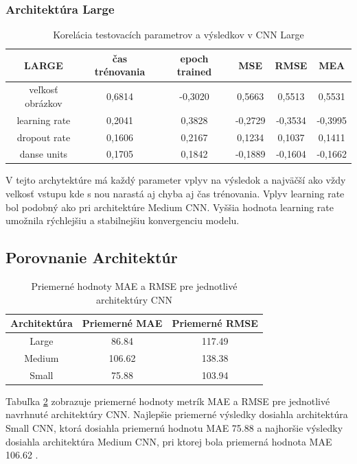 \subsubsection{Architektúra Large}
\begin{table}[h]
\caption{Korelácia testovacích parametrov a výsledkov v CNN Large}
\label{tab:large_corr}
\begin{tabular}{ | c |  c  c c c  c |}
\hline
	LARGE		& čas trénovania &  epoch trained & MSE &  RMSE  & MEA  \\
\hline
veľkosť obrázkov	& 0,6814 & -0,3020 & 0,5663 & 0,5513 & 0,5531\\
learning rate 		& 0,2041& 0,3828 & -0,2729 & -0,3534 & -0,3995 \\
dropout rate 		& 0,1606 & 0,2167 & 0,1234 & 0,1037  & 0,1411 \\
danse units 			& 0,1705& 0,1842 & -0,1889 & -0,1604 & -0,1662 \\
\hline
\end{tabular}
\end{table}
V tejto archytektúre má každý parameter vplyv na výsledok a najväčší ako vždy velkosť vstupu kde s nou narastá aj chyba aj čas trénovania.  Vplyv learning rate bol podobný ako pri architektúre Medium CNN. Vyššia hodnota learning rate umožnila rýchlejšiu a stabilnejšiu konvergenciu modelu.


\subsection{Porovnanie Architektúr}

\begin{table}[H]
\centering
\caption{Priemerné hodnoty MAE a RMSE pre jednotlivé architektúry CNN}
\label{tab:architecture_metrics}
\begin{tabular}{|c|c c|}
\hline
\textbf{Architektúra} & \textbf{Priemerné MAE} & \textbf{Priemerné RMSE} \\ \hline
Large  & 86.84  & 117.49 \\ 
Medium & 106.62 & 138.38 \\ 
Small  & 75.88  & 103.94 \\ 
\hline
\end{tabular}
\end{table}
Tabuľka \ref{tab:architecture_metrics} zobrazuje priemerné hodnoty metrík MAE a RMSE pre jednotlivé navrhnuté architektúry CNN. Najlepšie priemerné výsledky dosiahla architektúra Small CNN, ktorá dosiahla priemernú hodnotu MAE 75.88 a najhoršie výsledky dosiahla architektúra Medium CNN, pri ktorej bola priemerná hodnota MAE 106.62 .

